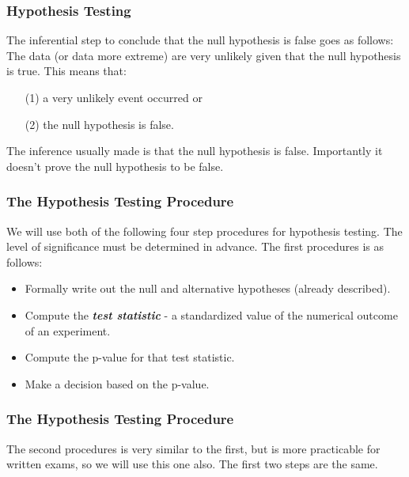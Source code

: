 \documentclass[]{report}
\begin{document}

\subsubsection{Hypothesis Testing}
The inferential step to conclude that the null hypothesis is false goes as follows: The data (or data more extreme) are very unlikely given that the null hypothesis is true.
\bigskip
This means that:
\begin{itemize}
\item[(1)] a very unlikely event occurred or
\item[(2)] the null hypothesis is false.
\end{itemize}
\bigskip
The inference usually made is that the null hypothesis is false. Importantly it doesn't prove the null hypothesis to be false.







\subsubsection{The Hypothesis Testing Procedure }
We will use both of the following four step procedures for hypothesis testing. The level of significance must be determined in advance. The first procedures is as follows:

\begin{itemize}
\item Formally write out the null and alternative hypotheses (already described).
\item Compute the \emph{\textbf{test statistic}} - a standardized value of the numerical outcome of an experiment.
\item Compute the p-value for that test statistic.
\item Make a decision based on the p-value.
\end{itemize}




\subsubsection{The Hypothesis Testing Procedure }
The second procedures is very similar to the first, but is more practicable for written exams, so we will use this one also. The first two steps are the same.
\end{document}

